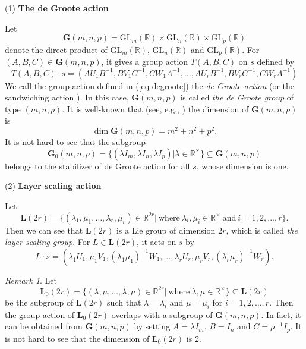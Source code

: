 \documentclass[reqno]{amsart}
\theoremstyle{definition}
\numberwithin{equation}{section}
\theoremstyle{remark}
\newtheorem{remark}[theorem]{Remark}
\begin{document}
(1) \textbf{The de Groote action}

Let 
\begin{equation}\label{eq-gmnp}
\mathbf{G}(m,n,p)=\mathrm{GL}_m(\mathbb{R})\times \mathrm{GL}_n(\mathbb{R}) \times \mathrm{GL}_p(\mathbb{R})
\end{equation}
denote the direct product of $\mathrm{GL}_m(\mathbb{R})$, $\mathrm{GL}_n(\mathbb{R})$ and  $ \mathrm{GL}_p(\mathbb{R})$. For $(A,B,C) \in \mathbf{G}(m,n,p)$, it gives a group action $T(A,B,C)$ on $s$ defined by 
\begin{equation}\label{eq-degroote}
T(A,B,C)\cdot s=\left(AU_1B^{-1},BV_1C^{-1},CW_1A^{-1},\ldots,
AU_rB^{-1},BV_rC^{-1},CW_rA^{-1}
\right)
\end{equation}
We call the group action defined in (\ref{eq-degroote}) the \emph{de Groote action} (or the sandwiching action \cite{kaumoo22}). In this case, $\mathbf{G}(m,n,p)$ is called \emph{the de Groote group} of type $(m,n,p)$. 
It is well-known that (see, e.g., \cite{olver93li}) the dimension of $\mathbf{G}(m,n,p)$ is 
\begin{equation*}
\dim \mathbf{G}(m,n,p)=m^2+n^2+p^2.
\end{equation*}
It is not hard to see that
the subgroup
\begin{equation}\label{eq-g0mnp}
\mathbf{G}_0(m,n,p)=\{(\lambda I_m,\lambda I_n, \lambda I_p)|\lambda\in \mathbb{R}^{\times} \}\subseteq \mathbf{G}(m,n,p)
\end{equation}
belongs to the stabilizer of de Groote action for all $s$, whose dimension is one.


(2) \textbf{Layer scaling action}

Let 
\begin{equation*} %
\mathbf{L}(2r)=\{(\lambda_1,\mu_1,\ldots,\lambda_r,\mu_r)\in \mathbb{R}^{2r}|~\text{where}~\lambda_i,\mu_i\in \mathbb{R}^\times~\text{and}~i=1,2,...,r\}.
\end{equation*}
Then we can see that $\mathbf{L}(2r)$ is a Lie group of dimension $2r$, which is called \emph{the layer scaling group}.
For $L \in \mathbf{L}(2r)$, it acts on $s$ by 
\begin{equation*}
L \cdot s=\left( \lambda_1 U_1, \mu_1 V_1, (\lambda_1\mu_1)^{-1}W_1, \ldots,
\lambda_r U_r, \mu_r V_r, (\lambda_r\mu_r)^{-1}W_r
\right).
\end{equation*}
\begin{remark}\label{rem-overlap}
Let 
\begin{equation*} 
\mathbf{L}_0(2r)=\{(\lambda,\mu,\ldots,\lambda,\mu)\in \mathbb{R}^{2r}|~\text{where}~\lambda,\mu\in \mathbb{R}^\times\}\subseteq
\mathbf{L}(2r)
\end{equation*}
be the subgroup of $\mathbf{L}(2r)$ such that $\lambda=\lambda_i$ and 
$\mu=\mu_i$ for $i=1,2,\ldots,r$. Then the group action of $\mathbf{L}_0(2r)$ overlaps with a subgroup of $\mathbf{G}(m,n,p)$. 
In fact, it can be obtained from $\mathbf{G}(m,n,p)$ by setting $A=\lambda I_m$, $B= I_n$ and $C=\mu^{-1} I_p$. It is not hard to see that the dimension of $\mathbf{L}_0(2r)$ is 2.
\end{remark}
\end{document}
